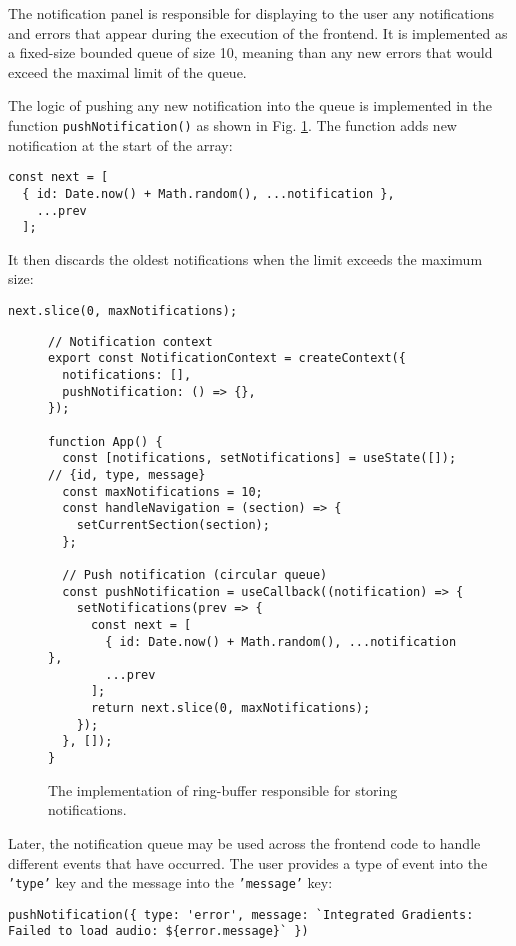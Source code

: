 \documentclass[
    bindingoffset=5mm,  %
    footnoteindent=3mm, %
    hyphenation=true    %
]{src/wut-thesis}
\begin{document}
The notification panel is responsible for displaying to the user any notifications
and errors that appear during the execution of the frontend. It is implemented as
a fixed-size bounded queue of size 10, meaning than any new errors that would exceed
the maximal limit of the queue.

The logic of pushing any new notification into the queue is implemented in the function
\texttt{pushNotification()} as shown in Fig. \ref{fig:NotificationImpl}.
The function adds new notification at the start of the array:

\begin{verbatim}
const next = [
  { id: Date.now() + Math.random(), ...notification },
    ...prev
  ];
\end{verbatim}

It then discards the oldest notifications when the limit exceeds the maximum size:
\begin{verbatim}
next.slice(0, maxNotifications);
\end{verbatim}

\begin{figure}%
\begin{verbatim}
// Notification context
export const NotificationContext = createContext({
  notifications: [],
  pushNotification: () => {},
});

function App() {
  const [notifications, setNotifications] = useState([]); // {id, type, message}
  const maxNotifications = 10;
  const handleNavigation = (section) => {
    setCurrentSection(section);
  };

  // Push notification (circular queue)
  const pushNotification = useCallback((notification) => {
    setNotifications(prev => {
      const next = [
        { id: Date.now() + Math.random(), ...notification },
        ...prev
      ];
      return next.slice(0, maxNotifications);
    });
  }, []);
}
\end{verbatim}
\caption{The implementation of ring-buffer responsible for storing notifications.}
\label{fig:NotificationImpl}
\end{figure}

Later, the notification queue may be used across the frontend code to handle different
events that have occurred. The user provides a type of event into the \texttt{'type'} key and
the message into the \texttt{'message'} key:
\begin{verbatim}
pushNotification({ type: 'error', message: `Integrated Gradients: Failed to load audio: ${error.message}` })
\end{verbatim}
\end{document}
